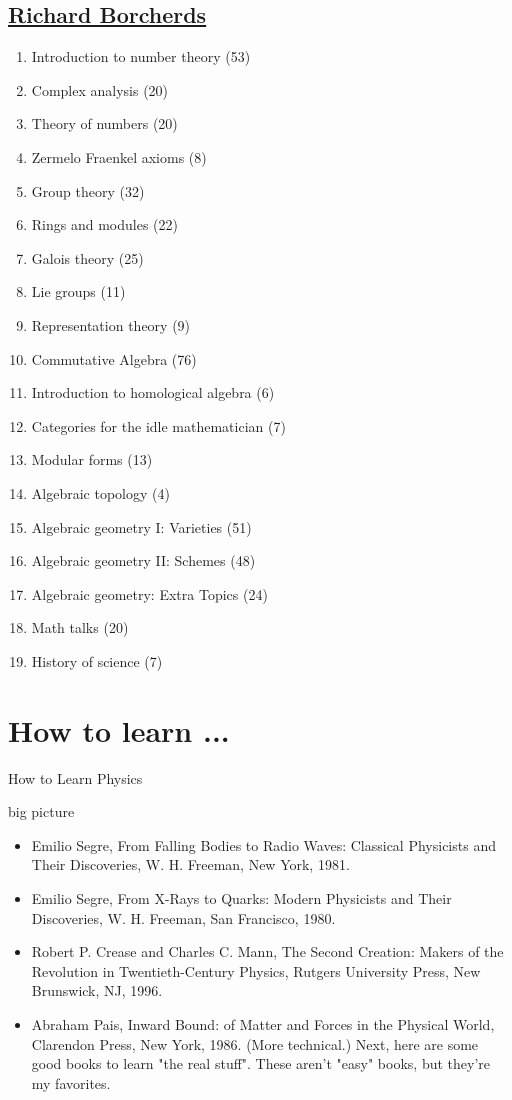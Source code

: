 \documentclass[10pt,a4paper]{book}
\theoremstyle{definition}
\begin{document}
\section{\href{https://www.youtube.com/@richarde.borcherds7998/playlists}{Richard Borcherds}}
\begin{enumerate}
\item Introduction to number theory (53)
\item Complex analysis (20)
\item Theory of numbers (20)
\item Zermelo Fraenkel axioms (8)
\item Group theory (32)
\item Rings and modules (22)
\item Galois theory (25)
\item Lie groups (11)
\item Representation theory (9)
\item Commutative Algebra (76)
\item Introduction to homological algebra (6)
\item Categories for the idle mathematician (7)
\item Modular forms (13)
\item Algebraic topology (4)
\item Algebraic geometry I: Varieties (51)
\item Algebraic geometry II: Schemes (48)
\item Algebraic geometry: Extra Topics (24)
\item Math talks (20)
\item History of science (7)
\end{enumerate}




\chapter{How to learn ...}
How to Learn Physics

big picture
\begin{itemize}
\item Emilio Segre, From Falling Bodies to Radio Waves: Classical Physicists and Their Discoveries, W. H. Freeman, New York, 1981.

\item Emilio Segre, From X-Rays to Quarks: Modern Physicists and Their Discoveries, W. H. Freeman, San Francisco, 1980.

\item Robert P. Crease and Charles C. Mann, The Second Creation: Makers of the Revolution in Twentieth-Century Physics, Rutgers University Press, New Brunswick, NJ, 1996.

\item Abraham Pais, Inward Bound: of Matter and Forces in the Physical World, Clarendon Press, New York, 1986. (More technical.)
Next, here are some good books to learn "the real stuff". These aren't "easy" books, but they're my favorites.
\end{itemize}
\end{document}
